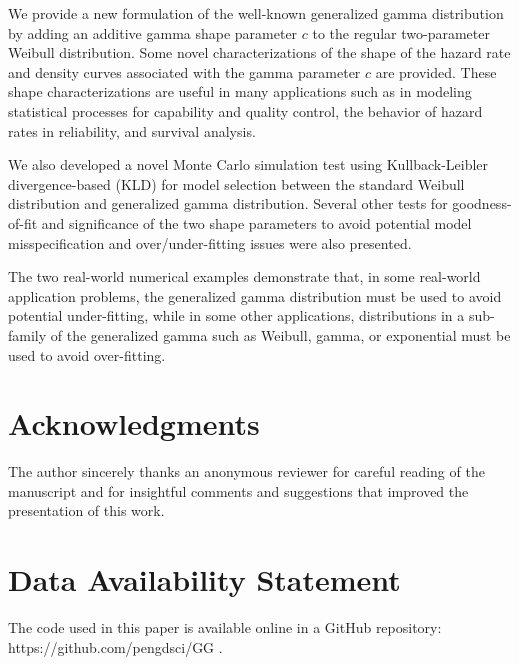 \documentclass{ps}
\theoremstyle{plain}%
\theoremstyle{definition}
\theoremstyle{remark}
\begin{document}
We provide a new formulation of the well-known generalized gamma distribution by adding an additive gamma shape parameter $c$ to the regular two-parameter Weibull distribution. Some novel characterizations of the shape of the hazard rate and density curves associated with the gamma parameter $c$ are provided. These shape characterizations are useful in many applications such as in modeling statistical processes for capability and quality control, the behavior of hazard rates in reliability, and survival analysis.   

We also developed a novel Monte Carlo simulation test using Kullback-Leibler divergence-based (KLD) for model selection between the standard Weibull distribution and generalized gamma distribution. Several other tests for goodness-of-fit and significance of the two shape parameters to avoid potential model misspecification and over/under-fitting issues were also presented. 

The two real-world numerical examples demonstrate that, in some real-world application problems, the generalized gamma distribution must be used to avoid potential under-fitting, while in some other applications, distributions in a sub-family of the generalized gamma such as Weibull, gamma, or exponential must be used to avoid over-fitting. 


\section*{Acknowledgments}

\begin{acknowledgement}
The author sincerely thanks an anonymous reviewer for careful reading of the manuscript and for insightful comments and suggestions that improved the presentation of this work.   
\end{acknowledgement}


\section*{Data Availability Statement}

The code used in this paper is available online in a GitHub repository: https://github.com/pengdsci/GG \cite{Peng-2023}.



\end{document}

